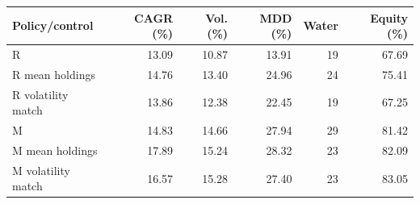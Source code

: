 \begin{tabular}{@{}lrrrrr@{}}\toprule
Policy/control & CAGR (\%) & Vol. (\%) & MDD (\%) & Water & Equity (\%)\\\midrule
R & 13.09 & 10.87 & 13.91 & 19 & 67.69\\
R mean holdings & 14.76 & 13.40 & 24.96 & 24 & 75.41\\
R volatility match & 13.86 & 12.38 & 22.45 & 19 & 67.25\\
M & 14.83 & 14.66 & 27.94 & 29 & 81.42\\
M mean holdings & 17.89 & 15.24 & 28.32 & 23 & 82.09\\
M volatility match & 16.57 & 15.28 & 27.40 & 23 & 83.05\\
\bottomrule
\end{tabular}
